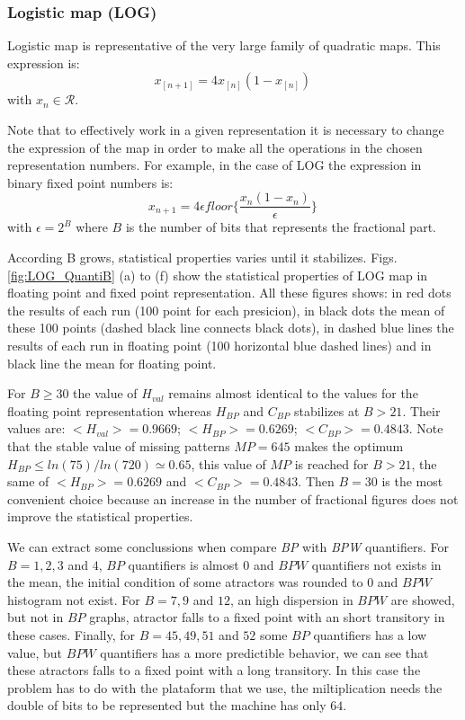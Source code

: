 \subsubsection{Logistic map (LOG)} \label{subsubsec:log}

Logistic map is representative of the very large family of quadratic maps.
This expression is:
\begin{equation}\label{eq:logimap}
 x_{[n+1]}=4x_{[n]}(1-x_{[n]}) \,
\end{equation}
with $x_n\in\mathcal{R}$.

Note that to effectively work in a given representation it is necessary to change the expression of the map in order to make all the operations in the chosen representation numbers. For example, in the case of LOG the expression in binary fixed point numbers is:
\begin{equation}\label{eq:logimapB2}
x_{n+1}=4 \epsilon floor\{\frac{x_n(1-x_n)}{\epsilon}\} \,
\end{equation}
with $\epsilon = 2^B$ where $B$ is the number of bits that represents the fractional part.

According B grows, statistical properties varies until it stabilizes.
Figs. \ref{fig:LOG_QuantiB} (a) to (f) show the statistical properties of LOG map in floating point and fixed point representation.
All these figures shows: in red dots the results of each run (100 point for each presicion), in black dots the mean of these 100 points (dashed black line connects black dots), in dashed blue lines the results of each run in floating point (100 horizontal blue dashed lines) and in black line the mean for floating point.

For $B\geq 30$ the value of $H_{val}$ remains almost identical to the values for the floating point representation whereas $H_{BP}$ and $C_{BP}$ stabilizes at $B>21$.
Their values are: $<H_{val}>=0.9669$; $<H_{BP}>=0.6269$; $<C_{BP}>=0.4843$.
Note that the stable value of missing patterns $MP=645$ makes the optimum $H_{BP} \leq ln(75)/ln(720) \simeq 0.65$, this value of $MP$ is reached for $B>21$, the same of $<H_{BP}>=0.6269$ and $<C_{BP}>=0.4843$.
Then $B=30$ is the most convenient choice because an increase in the number of fractional figures does not improve the statistical properties.

We can extract some conclussions when compare \textit{BP} with \textit{BPW} quantifiers.
For $B=1, 2, 3$ and $4$, $BP$ quantifiers is almost $0$ and $BPW$ quantifiers not exists in the mean, the initial condition of some atractors was rounded to $0$ and $BPW$ histogram not exist.
For $B=7, 9$ and $12$, an high dispersion in $BPW$ are showed, but not in $BP$ graphs, atractor falls to a fixed point with an short transitory in these cases.
Finally, for $B = 45, 49, 51$ and $52$ some $BP$ quantifiers has a low value, but $BPW$ quantifiers has a more predictible behavior, we can see that these atractors falls to a fixed point with a long transitory.
In this case the problem has to do with the plataform that we use, the miltiplication needs the double of bits to be represented but the machine has only $64$.

